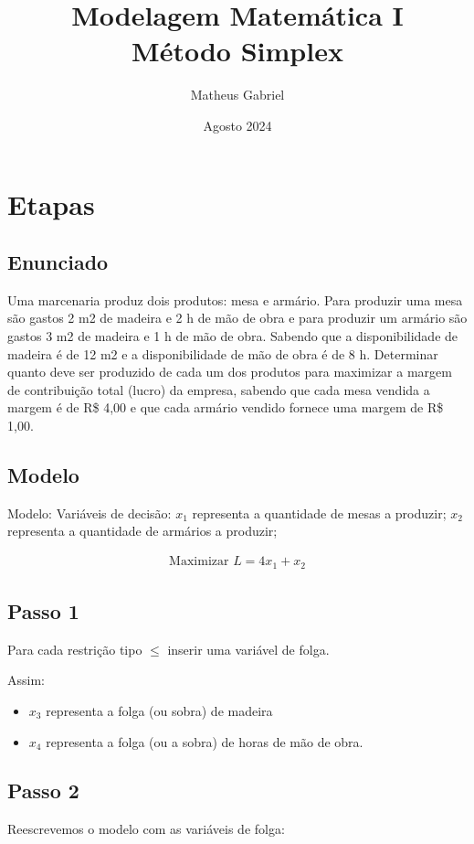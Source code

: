 \documentclass{article}
\title{Modelagem Matemática I\\
    \large Método Simplex}
\author{Matheus Gabriel}
\date{Agosto 2024}
\begin{document}
\maketitle

\section{Etapas}

\subsection{Enunciado}

Uma marcenaria produz dois produtos: mesa e armário. Para  produzir uma mesa são gastos 2 m2 de madeira e 2 h de mão de obra e para produzir um armário são gastos 3 m2 de madeira e 1 h de mão de obra. Sabendo que a disponibilidade de	madeira é de 12 m2 e a disponibilidade de mão de obra é de 8 h. Determinar quanto deve ser  produzido de cada um dos produtos para maximizar a margem de contribuição total (lucro) da empresa, sabendo que cada mesa vendida a margem é de R\$ 4,00 e que cada armário vendido fornece uma margem de  R\$ 1,00.

\subsection{Modelo}
Modelo:
Variáveis de decisão: 
$x_1$ representa a quantidade de mesas a produzir;
$x_2$ representa a quantidade de armários a produzir;

\begin{align*}
    \text{Maximizar } L =4x_1 + x_2
\end{align*}

\subsection{Passo 1}
Para cada restrição tipo $\leq$ inserir uma variável de folga. 

Assim:

\begin{itemize}
    \item $x_3$ representa a folga (ou sobra) de madeira
    \item $x_4$ representa a folga (ou a sobra) de horas de mão de obra.
\end{itemize}

\subsection{Passo 2}
Reescrevemos o modelo com as variáveis de folga:
\end{document}
